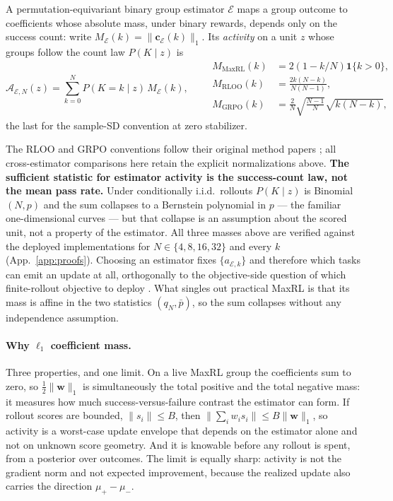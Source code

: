 \begin{definition}
\label{def:geom}
A permutation-equivariant binary group estimator $\mathcal E$ maps a group
outcome to coefficients whose absolute mass, under binary rewards, depends only
on the success count: write $M_{\mathcal E}(k)=\|\mathbf
c_{\mathcal E}(k)\|_1$. Its \emph{activity} on a unit $z$ whose groups follow
the count law $P(K\mid z)$ is
\[
\mathcal A_{\mathcal E,N}(z)=\sum_{k=0}^{N}P(K{=}k\mid z)\,M_{\mathcal E}(k),
\qquad
\begin{aligned}
M_{\text{MaxRL}}(k)&=2(1-k/N)\mathbf 1\{k>0\},\\
M_{\text{RLOO}}(k)&=\tfrac{2k(N-k)}{N(N-1)},\\
M_{\text{GRPO}}(k)&=\tfrac{2}{N}\sqrt{\tfrac{N-1}{N}}\sqrt{k(N-k)},
\end{aligned}
\]
the last for the sample-SD convention at zero stabilizer.
\end{definition}
\noindent
The RLOO and GRPO conventions follow their original method papers
\citep{rloo,grpo}; all cross-estimator comparisons here retain the explicit
normalizations above.
\textbf{The sufficient statistic for estimator activity is the success-count
law, not the mean pass rate.} Under conditionally i.i.d.\ rollouts
$P(K\mid z)$ is Binomial$(N,p)$ and the sum collapses to a Bernstein polynomial
in $p$ --- the familiar one-dimensional curves --- but that collapse is an
assumption about the scored unit, not a property of the estimator. All three
masses above are verified against the deployed implementations for
$N\in\{4,8,16,32\}$ and every $k$ (App.~\ref{app:proofs}).
Choosing an estimator fixes $\{a_{\mathcal E,k}\}$ and therefore which tasks can
emit an update at all, orthogonally to the objective-side question of which
finite-rollout objective to deploy \citep{maxrl,rl2ml}. What singles out
practical MaxRL is that its mass is affine in the two statistics $(q_N,\bar
p)$, so the sum collapses without any independence assumption.

\paragraph{Why $\ell_1$ coefficient mass.}
Three properties, and one limit. On a live MaxRL group the coefficients sum to
zero, so $\tfrac12\|\mathbf w\|_1$ is simultaneously the total positive and the
total negative mass: it measures how much success-versus-failure contrast the
estimator can form. If rollout scores are bounded, $\|s_i\|\le B$, then
$\|\sum_i w_is_i\|\le B\|\mathbf w\|_1$, so activity is a worst-case update
envelope that depends on the estimator alone and not on unknown score geometry.
And it is knowable before any rollout is spent, from a posterior over outcomes.
The limit is equally sharp: activity is not the gradient norm and not expected
improvement, because the realized update also carries the direction
$\mu_+-\mu_-$.

